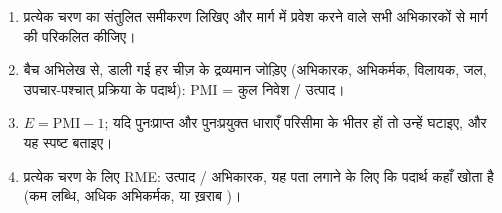 \begin{method}[किसी मार्ग के मापदंडों का परिकलन]\label{met:b3:green-industrial:metrics}
\begin{enumerate}
  \item प्रत्येक चरण का संतुलित समीकरण लिखिए और मार्ग में प्रवेश करने वाले सभी
        अभिकारकों से मार्ग की  परिकलित कीजिए।
  \item बैच अभिलेख से, डाली गई हर चीज़ के द्रव्यमान जोड़िए (अभिकारक,
        अभिकर्मक, विलायक, जल, उपचार-पश्चात् प्रक्रिया के पदार्थ): PMI = कुल निवेश / उत्पाद।
  \item $E = \mathrm{PMI} - 1$; यदि पुनःप्राप्त और पुनःप्रयुक्त धाराएँ परिसीमा के भीतर हों तो उन्हें
        घटाइए, और यह स्पष्ट बताइए।
  \item प्रत्येक चरण के लिए RME: उत्पाद / अभिकारक, यह पता लगाने के लिए कि पदार्थ कहाँ खोता है
        (कम लब्धि, अधिक अभिकर्मक, या ख़राब )।
\end{enumerate}
\end{method}

